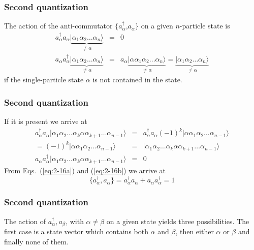 \documentclass[compress]{beamer}
\newcommand*{\ket}[1]{|#1\rangle}
\begin{document}
\frame
{
  \frametitle{Second quantization}
\begin{small}
{\scriptsize
The action of the anti-commutator 
$\{a_\alpha^\dagger$,$a_\alpha\}$ on a given $n$-particle state is
\begin{eqnarray}
	a_\alpha^\dagger a_\alpha \underbrace{\ket{\alpha_1\alpha_2 \dots \alpha_{n}}}_{\neq \alpha} &=& 0 \nonumber \\
	a_\alpha a_\alpha^\dagger \underbrace{\ket{\alpha_1\alpha_2 \dots \alpha_{n}}}_{\neq \alpha} &=&
	a_\alpha \underbrace{\ket{\alpha \alpha_1\alpha_2 \dots \alpha_{n}}}_{\neq \alpha} = 
	\underbrace{\ket{\alpha_1\alpha_2 \dots \alpha_{n}}}_{\neq \alpha} \label{eq:2-16a}
\end{eqnarray}
if the single-particle state $\alpha$ is not contained in the state.
}
\end{small}
}
\frame
{
  \frametitle{Second quantization}
\begin{small}
{\scriptsize
 If it is present
we arrive at
\begin{eqnarray}
	a_\alpha^\dagger a_\alpha \ket{\alpha_1\alpha_2 \dots \alpha_{k}\alpha \alpha_{k+1} \dots \alpha_{n-1}} &=&
	a_\alpha^\dagger a_\alpha (-1)^k \ket{\alpha \alpha_1\alpha_2 \dots \alpha_{n-1}} \nonumber \\
	= (-1)^k \ket{\alpha \alpha_1\alpha_2 \dots \alpha_{n-1}} &=& 
	\ket{\alpha_1\alpha_2 \dots \alpha_{k}\alpha \alpha_{k+1} \dots \alpha_{n-1}} \nonumber \\
	a_\alpha a_\alpha^\dagger\ket{\alpha_1\alpha_2 \dots \alpha_{k}\alpha \alpha_{k+1} \dots \alpha_{n-1}} &=& 0 \label{eq:2-16b}
\end{eqnarray}
From Eqs.~(\ref{eq:2-16a}) and  (\ref{eq:2-16b}) we arrive at 
\begin{equation}
	\{a_\alpha^\dagger , a_\alpha \} = a_\alpha^\dagger a_\alpha + a_\alpha a_\alpha^\dagger = 1 \label{eq:2-17}
\end{equation}
}
\end{small}
}
\frame
{
  \frametitle{Second quantization}
\begin{small}
{\scriptsize
The action of ${a_\alpha^\dagger, a_\beta}$, with 
$\alpha \ne \beta$ on a given state yields three possibilities. 
The first case is a state vector which contains both $\alpha$ and $\beta$, then either 
$\alpha$ or $\beta$ and finally none of them.
}
\end{small}
}
\frame
\end{document}
